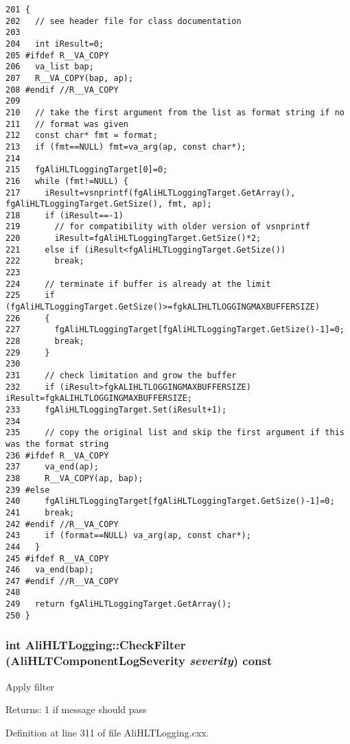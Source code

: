 \footnotesize\begin{verbatim}201 {
202   // see header file for class documentation
203 
204   int iResult=0;
205 #ifdef R__VA_COPY
206   va_list bap;
207   R__VA_COPY(bap, ap);
208 #endif //R__VA_COPY
209 
210   // take the first argument from the list as format string if no
211   // format was given
212   const char* fmt = format;
213   if (fmt==NULL) fmt=va_arg(ap, const char*);
214 
215   fgAliHLTLoggingTarget[0]=0;
216   while (fmt!=NULL) {
217     iResult=vsnprintf(fgAliHLTLoggingTarget.GetArray(), fgAliHLTLoggingTarget.GetSize(), fmt, ap);
218     if (iResult==-1)
219       // for compatibility with older version of vsnprintf
220       iResult=fgAliHLTLoggingTarget.GetSize()*2;
221     else if (iResult<fgAliHLTLoggingTarget.GetSize())
222       break;
223 
224     // terminate if buffer is already at the limit
225     if (fgAliHLTLoggingTarget.GetSize()>=fgkALIHLTLOGGINGMAXBUFFERSIZE) 
226     {
227       fgAliHLTLoggingTarget[fgAliHLTLoggingTarget.GetSize()-1]=0;
228       break;
229     }
230 
231     // check limitation and grow the buffer
232     if (iResult>fgkALIHLTLOGGINGMAXBUFFERSIZE) iResult=fgkALIHLTLOGGINGMAXBUFFERSIZE;
233     fgAliHLTLoggingTarget.Set(iResult+1);
234 
235     // copy the original list and skip the first argument if this was the format string
236 #ifdef R__VA_COPY
237     va_end(ap);
238     R__VA_COPY(ap, bap);
239 #else
240     fgAliHLTLoggingTarget[fgAliHLTLoggingTarget.GetSize()-1]=0;
241     break;
242 #endif //R__VA_COPY
243     if (format==NULL) va_arg(ap, const char*);
244   }     
245 #ifdef R__VA_COPY
246   va_end(bap);
247 #endif //R__VA_COPY
248 
249   return fgAliHLTLoggingTarget.GetArray();
250 }
\end{verbatim}\normalsize 


\subsubsection{\setlength{\rightskip}{0pt plus 5cm}int Ali\-HLTLogging::Check\-Filter ({\bf Ali\-HLTComponent\-Log\-Severity} {\em severity}) const}\label{classAliHLTLogging_a9}


Apply filter \begin{Desc}
\item[Returns:]1 if message should pass \end{Desc}


Definition at line 311 of file Ali\-HLTLogging.cxx.

